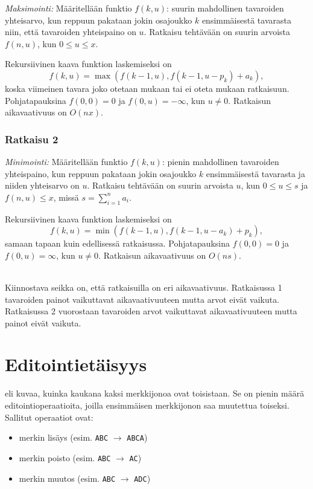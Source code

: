 \textit{Maksimointi:} Määritellään funktio $f(k,u)$:
suurin mahdollinen tavaroiden
yhteisarvo, kun reppuun pakataan jokin osajoukko
$k$ ensimmäisestä tavarasta
niin, että tavaroiden yhteispaino on $u$.
Ratkaisu tehtävään on suurin arvoista
$f(n,u)$, kun $0 \le u \le x$.

Rekursiivinen kaava funktion laskemiseksi on
\[f(k,u) = \max(f(k-1,u),f(k-1,u-p_k)+a_k),\]
koska viimeinen tavara joko otetaan mukaan tai ei
oteta mukaan ratkaisuun.
Pohjatapauksina $f(0,0)=0$ ja $f(0,u)=-\infty$,
kun $u \neq 0$. Ratkaisun aikavaativuus on $O(nx)$.

\subsubsection{Ratkaisu 2}

\textit{Minimointi:} Määritellään funktio $f(k,u)$:
pienin mahdollinen tavaroiden yhteispaino,
kun reppuun pakataan jokin osajoukko
$k$ ensimmäisestä tavarasta ja niiden yhteisarvo on $u$.
Ratkaisu tehtävään on suurin arvoista
$u$, kun $0 \le u \le s$ ja $f(n,u) \le x$,
missä $s=\sum_{i=1}^n a_i$.

Rekursiivinen kaava funktion laskemiseksi on
\[f(k,u) = \min(f(k-1,u),f(k-1,u-a_k)+p_k),\]
samaan tapaan kuin edellisessä ratkaisussa.
Pohjatapauksina $f(0,0)=0$ ja $f(0,u)=\infty$, kun $u \neq 0$.
Ratkaisun aikavaativuus on $O(ns)$.


~\\
\noindent
Kiinnostava seikka on, että ratkaisuilla on eri aikavaativuus.
Ratkaisussa 1 tavaroiden painot vaikuttavat aikavaativuuteen
mutta arvot eivät vaikuta.
Ratkaisussa 2 vuorostaan tavaroiden arvot vaikuttavat aikavaativuuteen
mutta painot eivät vaikuta.

\section{Editointietäisyys}


 eli
kuvaa, kuinka kaukana kaksi merkkijonoa ovat toisistaan.
Se on pienin määrä editointioperaatioita,
joilla ensimmäisen merkkijonon saa muutettua toiseksi.
Sallitut operaatiot ovat:
\begin{itemize}
\item merkin lisäys (esim. \texttt{ABC} $\rightarrow$ \texttt{ABCA})
\item merkin poisto (esim. \texttt{ABC} $\rightarrow$ \texttt{AC})
\item merkin muutos (esim. \texttt{ABC} $\rightarrow$ \texttt{ADC})
\end{itemize}


